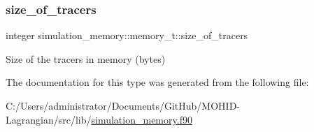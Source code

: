\subsubsection{\texorpdfstring{size\+\_\+of\+\_\+tracers}{size\_of\_tracers}}
{\footnotesize\ttfamily integer simulation\+\_\+memory\+::memory\+\_\+t\+::size\+\_\+of\+\_\+tracers\hspace{0.3cm}{\ttfamily [private]}}



Size of the tracers in memory (bytes) 



The documentation for this type was generated from the following file\+:\begin{DoxyCompactItemize}
\item 
C\+:/\+Users/administrator/\+Documents/\+Git\+Hub/\+M\+O\+H\+I\+D-\/\+Lagrangian/src/lib/\mbox{\hyperlink{simulation__memory_8f90}{simulation\+\_\+memory.\+f90}}\end{DoxyCompactItemize}
